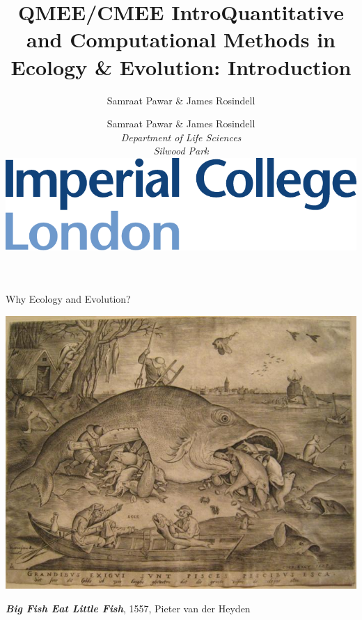 \documentclass[xcolor={usenames,x11names},compress]{beamer}
\title{QMEE/CMEE Intro}
\author{Samraat Pawar \& James Rosindell}
\renewcommand{\(}{\begin{columns}}
\renewcommand{\)}{\end{columns}}
\newcommand{\<}[1]{\begin{column}{#1}}
\renewcommand{\>}{\end{column}}
\begin{document}
\begin{frame}[plain]

\title{Quantitative and Computational Methods in Ecology \& Evolution:
Introduction}
\vspace{12pt}
\author{
	Samraat Pawar \& James Rosindell\\
	\vspace{10pt}
	{\it Department of Life Sciences\\
	\vspace{10pt}
	 Silwood Park}\\
	\vspace{20pt}
  \centering
  \includegraphics[height = .3in]{Imperial_Color1.pdf}
}
 
\titlepage
\end{frame}


\begin{frame}{Why Ecology and Evolution?}

\centering

\includegraphics[width=.7\textwidth]{Pieter_Fish.jpg}

\vspace{6pt}

{\small {\bf \it Big Fish Eat Little Fish}, 1557, Pieter van der Heyden}

\end{frame}
\end{document}
